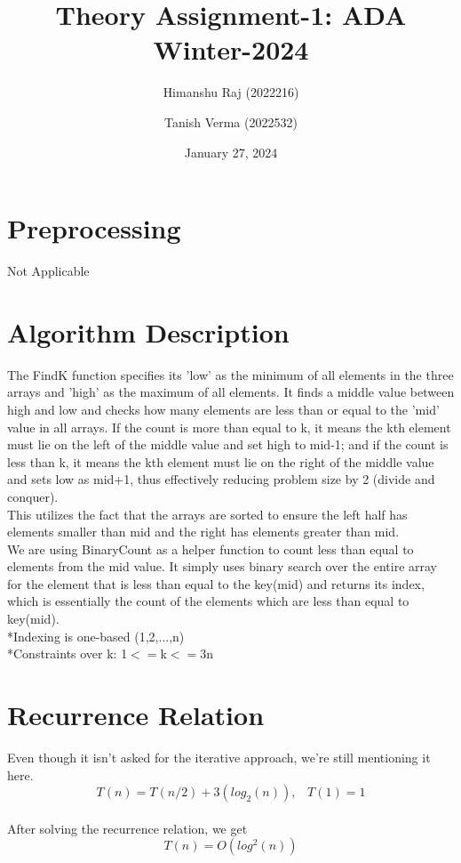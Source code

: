 \documentclass{article}
\title{Theory Assignment-1: ADA Winter-2024}
\author{Himanshu Raj (2022216) \and Tanish Verma (2022532)}
\date{January 27, 2024}
\begin{document}
\maketitle

\section{Preprocessing}
Not Applicable

\section{Algorithm Description}
The FindK function specifies its 'low' as the minimum of all elements in the three arrays and 'high' as the maximum of all elements. It finds a middle value between high and low and checks how many elements are less than or equal to the 'mid' value in all arrays. If the count is more than equal to k, it means the kth element must lie on the left of the middle value and set high to mid-1; and if the count is less than k, it means the kth element must lie on the right of the middle value and sets low as mid+1, thus effectively reducing problem size by 2 (divide and conquer).\\
This utilizes the fact that the arrays are sorted to ensure the left half has elements smaller than mid and the right has elements greater than mid.\\
\newline
We are using BinaryCount as a helper function to count less than equal to elements from the mid value. It simply uses binary search over the entire array for the element that is less than equal to the key(mid) and returns its index, which is essentially the count of the elements which are less than equal to key(mid).\\
\newline
*Indexing is one-based (1,2,...,n)\\
*Constraints over k: 1$<=$k$<=$3n

\section{Recurrence Relation}
Even though it isn't asked for the iterative approach, we're still mentioning it here.\\
\[T(n) = T(n/2) + 3(log_2(n)), \hspace{10pt} T(1) = 1\]\\
After solving the recurrence relation, we get\\
\[T(n) = O(log^2 (n))\]
\end{document}
